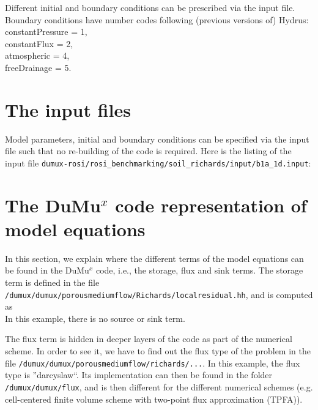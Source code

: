Different initial and boundary conditions can be prescribed via the input file. Boundary conditions have number codes following (previous versions of) Hydrus: \\
constantPressure = 1,\\
constantFlux = 2, \\
atmospheric = 4, \\
freeDrainage = 5.

\section*{The input files}
Model parameters, initial and boundary conditions can be specified via the input file such that no re-building of the code is required. 
Here is the listing of the input file \lstinline{dumux-rosi/rosi_benchmarking/soil_richards/input/b1a_1d.input}: 
	

\section*{The DuMu$^x$ code representation of model equations}
In this section, we explain where the different terms of the model equations can be found in the DuMu$^x$ code, i.e., the storage, flux and sink terms. 
The storage term is defined in the file \\
\verb+/dumux/dumux/porousmediumflow/Richards/localresidual.hh+, and is computed as\\
		
In this example, there is no source or sink term. 


The flux term is hidden in deeper layers of the code as part of the numerical scheme. In order to see it, we have to find out the flux type of the problem in the file 
\verb+/dumux/dumux/porousmediumflow/richards/...+. In this example, the flux type is ''darcyslaw``. Its implementation can then be found in the folder \verb+/dumux/dumux/flux+, and is then different for the different numerical schemes (e.g. cell-centered finite volume scheme with two-point flux approximation (TPFA)). 

%	

